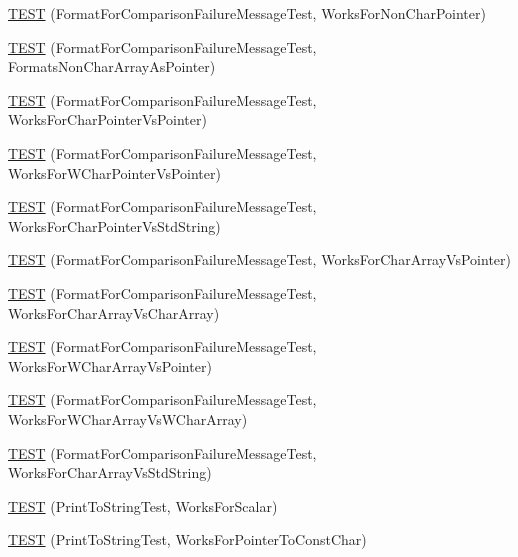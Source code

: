 \begin{DoxyCompactItemize}
\item 
\hyperlink{namespacetesting_1_1gtest__printers__test_adb093d9323bfb766be8c91215c46056e}{T\+E\+ST} (Format\+For\+Comparison\+Failure\+Message\+Test, Works\+For\+Non\+Char\+Pointer)
\item 
\hyperlink{namespacetesting_1_1gtest__printers__test_a3571808f93f419268b6aed1aa127ea30}{T\+E\+ST} (Format\+For\+Comparison\+Failure\+Message\+Test, Formats\+Non\+Char\+Array\+As\+Pointer)
\item 
\hyperlink{namespacetesting_1_1gtest__printers__test_a1694d4063da702f5379495d3cb2cbc91}{T\+E\+ST} (Format\+For\+Comparison\+Failure\+Message\+Test, Works\+For\+Char\+Pointer\+Vs\+Pointer)
\item 
\hyperlink{namespacetesting_1_1gtest__printers__test_a735171f4ba0a9dffee9c4c7321107822}{T\+E\+ST} (Format\+For\+Comparison\+Failure\+Message\+Test, Works\+For\+W\+Char\+Pointer\+Vs\+Pointer)
\item 
\hyperlink{namespacetesting_1_1gtest__printers__test_ab5a910170489276c14b817b70d4feb96}{T\+E\+ST} (Format\+For\+Comparison\+Failure\+Message\+Test, Works\+For\+Char\+Pointer\+Vs\+Std\+String)
\item 
\hyperlink{namespacetesting_1_1gtest__printers__test_ac25834e0463cf9f3d231db24e7b220e5}{T\+E\+ST} (Format\+For\+Comparison\+Failure\+Message\+Test, Works\+For\+Char\+Array\+Vs\+Pointer)
\item 
\hyperlink{namespacetesting_1_1gtest__printers__test_aba32640344f0186de5fbb6bb47e0c5a5}{T\+E\+ST} (Format\+For\+Comparison\+Failure\+Message\+Test, Works\+For\+Char\+Array\+Vs\+Char\+Array)
\item 
\hyperlink{namespacetesting_1_1gtest__printers__test_a1e95289500400eff5fdcd45c5864a6d2}{T\+E\+ST} (Format\+For\+Comparison\+Failure\+Message\+Test, Works\+For\+W\+Char\+Array\+Vs\+Pointer)
\item 
\hyperlink{namespacetesting_1_1gtest__printers__test_af4b502fb5745d2ee0bfb81d1c8eb95f6}{T\+E\+ST} (Format\+For\+Comparison\+Failure\+Message\+Test, Works\+For\+W\+Char\+Array\+Vs\+W\+Char\+Array)
\item 
\hyperlink{namespacetesting_1_1gtest__printers__test_ac2300073f401f783ff7b1ef97d2cbd6d}{T\+E\+ST} (Format\+For\+Comparison\+Failure\+Message\+Test, Works\+For\+Char\+Array\+Vs\+Std\+String)
\item 
\hyperlink{namespacetesting_1_1gtest__printers__test_a5d1bc4b12c18ccaec2ced9f45c092567}{T\+E\+ST} (Print\+To\+String\+Test, Works\+For\+Scalar)
\item 
\hyperlink{namespacetesting_1_1gtest__printers__test_a68100148758516ebab9c761ca7778586}{T\+E\+ST} (Print\+To\+String\+Test, Works\+For\+Pointer\+To\+Const\+Char)

\end{DoxyCompactItemize}
